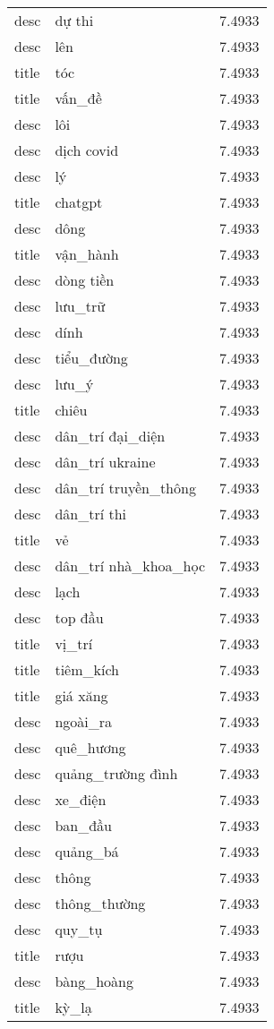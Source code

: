 \documentclass{article}
\begin{document}
\begin{tabular}{lll}
desc & dự thi & 7.4933\\
desc & lên & 7.4933\\
title & tóc & 7.4933\\
title & vấn\_đề & 7.4933\\
desc & lôi & 7.4933\\
desc & dịch covid & 7.4933\\
desc & lý & 7.4933\\
title & chatgpt & 7.4933\\
desc & dông & 7.4933\\
title & vận\_hành & 7.4933\\
desc & dòng tiền & 7.4933\\
desc & lưu\_trữ & 7.4933\\
desc & dính & 7.4933\\
desc & tiểu\_đường & 7.4933\\
desc & lưu\_ý & 7.4933\\
title & chiêu & 7.4933\\
desc & dân\_trí đại\_diện & 7.4933\\
desc & dân\_trí ukraine & 7.4933\\
desc & dân\_trí truyền\_thông & 7.4933\\
desc & dân\_trí thi & 7.4933\\
title & vẻ & 7.4933\\
desc & dân\_trí nhà\_khoa\_học & 7.4933\\
desc & lạch & 7.4933\\
desc & top đầu & 7.4933\\
title & vị\_trí & 7.4933\\
title & tiêm\_kích & 7.4933\\
title & giá xăng & 7.4933\\
desc & ngoài\_ra & 7.4933\\
desc & quê\_hương & 7.4933\\
desc & quảng\_trường đình & 7.4933\\
desc & xe\_điện & 7.4933\\
desc & ban\_đầu & 7.4933\\
desc & quảng\_bá & 7.4933\\
desc & thông & 7.4933\\
desc & thông\_thường & 7.4933\\
desc & quy\_tụ & 7.4933\\
title & rượu & 7.4933\\
desc & bàng\_hoàng & 7.4933\\
title & kỳ\_lạ & 7.4933\\

\end{tabular}
\end{document}
